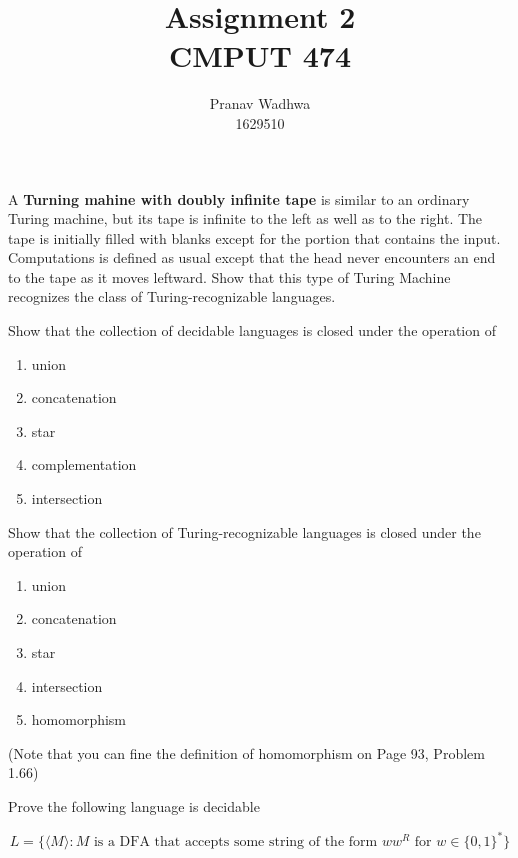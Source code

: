 \documentclass[12pt]{exam}
\title{
  Assignment 2\\
  \large CMPUT 474
}
\author{Pranav Wadhwa\\1629510}
\begin{document}
\maketitle
\noindent


\begin{questions}

  \question{}
  A \textbf{Turning mahine with doubly infinite tape} is similar to an ordinary Turing machine, but its tape is infinite to the left as well as to the right.
  The tape is initially filled with blanks except for the portion that contains the input.
  Computations is defined as usual except that the head never encounters an end to the tape as it moves leftward.
  Show that this type of Turing Machine recognizes the class of Turing-recognizable languages.



  \question{}
  Show that the collection of decidable languages is closed under the operation of
  \begin{multicols}{2}
  \begin{enumerate}
    \item union
    \item concatenation
    \item star
    \item complementation
    \item intersection
  \end{enumerate}
  \end{multicols}


  \question{}
  Show that the collection of Turing-recognizable languages is closed under the operation of

  \begin{multicols}{2}
  \begin{enumerate}
    \item union
    \item concatenation
    \item star
    \item intersection
    \item homomorphism
  \end{enumerate}
  \end{multicols}

  (Note that you can fine the definition of homomorphism on Page 93, Problem 1.66)


  \question{}
  Prove the following language is decidable

  \[L=\{\langle M \rangle :M\text{ is a DFA that accepts some string of the form } ww^{R} \text{ for } w\in \{0,1\}^{*}\}\]



\end{questions}
\end{document}
